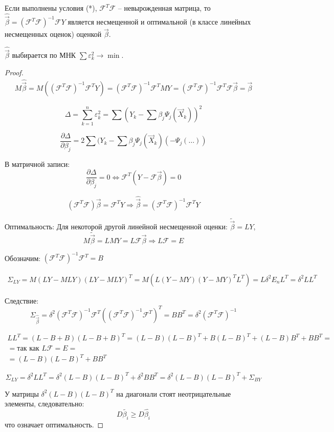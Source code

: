 \begin{theorem}
  Если выполнены условия (*), $\mathcal{F}^T \mathcal{F}$ -- невырожденная матрица, то
  $\hat{\vec{\beta}} = (\mathcal{F}^T \mathcal{F})^{-1} \mathcal{F} Y$ является несмещенной и оптимальной (в классе линейных несмещенных оценок) оценкой $\vec{\beta}$.
\end{theorem}
\begin{remark*}
$\hat{\vec{\beta}}$ выбирается по МНК $\sum \varepsilon_k^2 \to \min$.
\end{remark*}
\begin{proof}
  \begin{multline*}
    M \hat{\vec{\beta}} = M ( (\mathcal{F}^T \mathcal{F})^{-1} \mathcal{F}^T Y )
    = (\mathcal{F}^T \mathcal{F})^{-1} \mathcal{F}^T MY 
    =(\mathcal{F}^T \mathcal{F})^{-1} \mathcal{F}^T \mathcal{F} \vec{\beta}
    = \vec{\beta}
  \end{multline*}

  \[ 
    \Delta = \sum_{k=1}^n \varepsilon_k^2
    = \sum (Y_k - \sum \beta_j \Psi_j (\vec{X}_k) )^2
  \] 

  \[
    \frac{\partial \Delta}{\partial \beta_j} = 2 \sum (Y_k - \sum \beta_j \Psi_j(\vec{X}_k) (-\Psi_j (\dots)) 
  \]

  В матричной записи:
  \[
    \frac{\partial \Delta}{\partial \beta_j} = 0
    \Leftrightarrow \mathcal{F}^T (Y - \mathcal{F} \vec{\beta}) = 0
  \]

  \[
    (\mathcal{F}^T \mathcal{F}) \vec{\beta} = \mathcal{F}^T Y
    \Rightarrow
    \hat{\vec{\beta}} = (\mathcal{F}^T \mathcal{F})^{-1} \mathcal{F}^T Y
  \]

  Оптимальность:
  Для некоторой другой линейной несмещенной оценки:
  $\tilde{\vec{\beta}} = L Y$,
  \[
    M \tilde{\vec{\beta}} = L MY = L \mathcal{F} \vec{\beta}
    \Rightarrow L \mathcal{F} = E
  \]

  Обозначим: $(\mathcal{F}^T \mathcal{F})^{-1} \mathcal{F}^T = B$

  \begin{multline*}
    \Sigma_{LY} = M(LY - MLY)(LY - MLY)^T = M( L(Y-MY)(Y-MY)^T L^T ) = L \delta^2 E_n L^T = \delta^2 L L^T
  \end{multline*}

  Следствие: 
  \[
    \Sigma_{\hat{\vec{\beta}}} = \delta^2 (\mathcal{F}^T \mathcal{F})^{-1} \mathcal{F}^T ( (\mathcal{F}^T \mathcal{F})^{-1} \mathcal{F}^T )^T = B B^T = \delta^2 (\mathcal{F}^T \mathcal{F})^{-1} 
  \]

  \begin{multline*}
    LL^T = (L-B+B) (L-B+B)^T = (L-B)(L-B)^T + B (L-B)^T + (L-B) B^T + BB^T = \\
    = \text{так как $L\mathcal{F} = E$} = \\
    = (L-B)(L-B)^T + BB^T
  \end{multline*}

  \[
    \Sigma_{LY} = \delta^2 LL^T = \delta^2 (L-B)(L-B)^T + \delta^2 BB^T = \delta^2 (L-B)(L-B)^T + \Sigma_{BY}
  \]

  У матрицы $\delta^2 (L-B)(L-B)^T$ на диагонали стоят неотрицательные элементы, следовательно:
  \[
    D\tilde{\beta_i} \geqslant D\hat{\beta_i}
  \]
  что означает оптимальность.
\end{proof}


